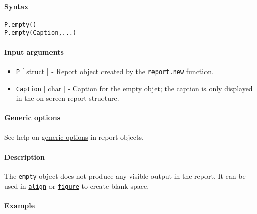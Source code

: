 


	\paragraph{Syntax}\label{syntax}

\begin{verbatim}
P.empty()
P.empty(Caption,...)
\end{verbatim}

\paragraph{Input arguments}\label{input-arguments}

\begin{itemize}
\item
  \texttt{P} {[} struct {]} - Report object created by the
  \href{report/new}{\texttt{report.new}} function.
\item
  \texttt{Caption} {[} char {]} - Caption for the empty objet; the
  caption is only displayed in the on-screen report structure.
\end{itemize}

\paragraph{Generic options}\label{generic-options}

See help on \href{report/Contents}{generic options} in report objects.

\paragraph{Description}\label{description}

The \texttt{empty} object does not produce any visible output in the
report. It can be used in \href{report/align}{\texttt{align}} or
\href{report/figure}{\texttt{figure}} to create blank space.

\paragraph{Example}\label{example}


